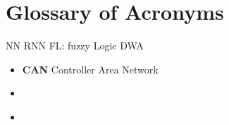 \chapter*{Glossary of Acronyms}

NN
RNN
FL: fuzzy Logic
DWA

\begin{itemize}
    \item \textbf{CAN} Controller Area Network
    \item \textbf{} 

    \newpage
    \thispagestyle{acronyms}
    \item \textbf{} 

\end{itemize}

\newpage







